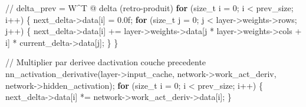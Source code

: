 \documentclass[
  letterpaper,
  DIV=11,
  numbers=noendperiod]{scrartcl}
\newenvironment{Shaded}{\begin{snugshade}}{\end{snugshade}}
\newcommand{\BuiltInTok}[1]{\textcolor[rgb]{0.00,0.23,0.31}{#1}}
\newcommand{\CommentTok}[1]{\textcolor[rgb]{0.37,0.37,0.37}{#1}}
\newcommand{\ControlFlowTok}[1]{\textcolor[rgb]{0.00,0.23,0.31}{\textbf{#1}}}
\newcommand{\DataTypeTok}[1]{\textcolor[rgb]{0.68,0.00,0.00}{#1}}
\newcommand{\DecValTok}[1]{\textcolor[rgb]{0.68,0.00,0.00}{#1}}
\newcommand{\FloatTok}[1]{\textcolor[rgb]{0.68,0.00,0.00}{#1}}
\newcommand{\NormalTok}[1]{\textcolor[rgb]{0.00,0.23,0.31}{#1}}
\newcommand{\OperatorTok}[1]{\textcolor[rgb]{0.37,0.37,0.37}{#1}}
\begin{document}
\begin{Shaded}
\begin{Highlighting}[]
            \CommentTok{// delta\_prev = W\^{}T @ delta (retro-produit)}
            \ControlFlowTok{for} \OperatorTok{(}\DataTypeTok{size\_t}\NormalTok{ i }\OperatorTok{=} \DecValTok{0}\OperatorTok{;}\NormalTok{ i }\OperatorTok{\textless{}}\NormalTok{ prev\_size}\OperatorTok{;}\NormalTok{ i}\OperatorTok{++)} \OperatorTok{\{}
\NormalTok{                next\_delta}\OperatorTok{{-}\textgreater{}}\NormalTok{data}\OperatorTok{[}\NormalTok{i}\OperatorTok{]} \OperatorTok{=} \FloatTok{0.0}\BuiltInTok{f}\OperatorTok{;}
                \ControlFlowTok{for} \OperatorTok{(}\DataTypeTok{size\_t}\NormalTok{ j }\OperatorTok{=} \DecValTok{0}\OperatorTok{;}\NormalTok{ j }\OperatorTok{\textless{}}\NormalTok{ layer}\OperatorTok{{-}\textgreater{}}\NormalTok{weights}\OperatorTok{{-}\textgreater{}}\NormalTok{rows}\OperatorTok{;}\NormalTok{ j}\OperatorTok{++)} \OperatorTok{\{}
\NormalTok{                    next\_delta}\OperatorTok{{-}\textgreater{}}\NormalTok{data}\OperatorTok{[}\NormalTok{i}\OperatorTok{]} \OperatorTok{+=}
\NormalTok{                        layer}\OperatorTok{{-}\textgreater{}}\NormalTok{weights}\OperatorTok{{-}\textgreater{}}\NormalTok{data}\OperatorTok{[}\NormalTok{j }\OperatorTok{*}\NormalTok{ layer}\OperatorTok{{-}\textgreater{}}\NormalTok{weights}\OperatorTok{{-}\textgreater{}}\NormalTok{cols }\OperatorTok{+}\NormalTok{ i}\OperatorTok{]}
                        \OperatorTok{*}\NormalTok{ current\_delta}\OperatorTok{{-}\textgreater{}}\NormalTok{data}\OperatorTok{[}\NormalTok{j}\OperatorTok{];}
                \OperatorTok{\}}
            \OperatorTok{\}}

            \CommentTok{// Multiplier par derivee d\textquotesingle{}activation couche precedente}
\NormalTok{            nn\_activation\_derivative}\OperatorTok{(}\NormalTok{layer}\OperatorTok{{-}\textgreater{}}\NormalTok{input\_cache}\OperatorTok{,}
\NormalTok{                                    network}\OperatorTok{{-}\textgreater{}}\NormalTok{work\_act\_deriv}\OperatorTok{,}
\NormalTok{                                    network}\OperatorTok{{-}\textgreater{}}\NormalTok{hidden\_activation}\OperatorTok{);}
            \ControlFlowTok{for} \OperatorTok{(}\DataTypeTok{size\_t}\NormalTok{ i }\OperatorTok{=} \DecValTok{0}\OperatorTok{;}\NormalTok{ i }\OperatorTok{\textless{}}\NormalTok{ prev\_size}\OperatorTok{;}\NormalTok{ i}\OperatorTok{++)} \OperatorTok{\{}
\NormalTok{                next\_delta}\OperatorTok{{-}\textgreater{}}\NormalTok{data}\OperatorTok{[}\NormalTok{i}\OperatorTok{]} \OperatorTok{*=}\NormalTok{ network}\OperatorTok{{-}\textgreater{}}\NormalTok{work\_act\_deriv}\OperatorTok{{-}\textgreater{}}\NormalTok{data}\OperatorTok{[}\NormalTok{i}\OperatorTok{];}
            \OperatorTok{\}}


\end{Highlighting}
\end{Shaded}
\end{document}
